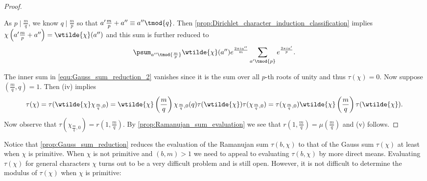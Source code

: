 \begin{proof}
\begin{enumerate}[label=(\roman*)]
\[            \]
            As $p \mid \frac{m}{q}$, we know $q \mid \frac{m}{p}$ so that $a'\frac{m}{p}+a'' \equiv a'' \tmod{q}$. Then \cref{prop:Dirichlet_character_induction_classification} implies $\chi\left(a'\frac{m}{p}+a''\right) = \wtilde{\chi}(a'')$ and this sum is further reduced to
            \begin{equation}\label{equ:Gauss_sum_reduction_2}
              \psum_{a'' \tmod{\frac{m}{p}}}\wtilde{\chi}(a'')e^{\frac{2\pi ia''}{m}}\sum_{a' \tmod{p}}e^{\frac{2\pi ia'}{p}}.
            \end{equation}
          \end{enumerate}
          The inner sum in \cref{equ:Gauss_sum_reduction_2} vanishes since it is the sum over all $p$-th roots of unity and thus $\tau(\chi) = 0$. Now suppose $\left(\frac{m}{q},q\right) = 1$. Then (iv) implies
          \[
            \tau(\chi) = \tau(\wtilde{\chi}\chi_{\frac{m}{q},0}) = \wtilde{\chi}\left(\frac{m}{q}\right)\chi_{\frac{m}{q},0}(q)\tau(\wtilde{\chi})\tau(\chi_{\frac{m}{q},0}) = \tau(\chi_{\frac{m}{q},0})\wtilde{\chi}\left(\frac{m}{q}\right)\tau(\wtilde{\chi}).
          \]
          Now observe that $\tau(\chi_{\frac{m}{q},0}) = r\left(1,\frac{m}{q}\right)$. By \cref{prop:Ramanujan_sum_evaluation} we see that $r\left(1,\frac{m}{q}\right) = \mu\left(\frac{m}{q}\right)$ and (v) follows.
        \end{proof}

        Notice that \cref{prop:Gauss_sum_reduction} reduces the evaluation of the Ramanujan sum $\tau(b,\chi)$ to that of the Gauss sum $\tau(\chi)$ at least when $\chi$ is primitive. When $\chi$ is not primitive and $(b,m) > 1$ we need to appeal to evaluating $\tau(b,\chi)$ by more direct means. Evaluating $\tau(\chi)$ for general characters $\chi$ turns out to be a very difficult problem and is still open. However, it is not difficult to determine the modulus of $\tau(\chi)$ when $\chi$ is primitive:

